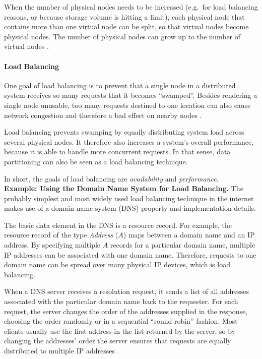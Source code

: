 When the number of physical nodes needs to be increased (e.g.\ for load balancing reasons, or because storage volume is hitting a limit), each physical node that contains more than one virtual node can be split, so that virtual nodes become physical nodes. The number of physical nodes can grow up to the number of virtual nodes \cite[p.~166f]{ASL10} \cite{Bas10b}.

\paragraph{Load Balancing}
One goal of load balancing is to prevent that a single node in a distributed system receives so many requests that it becomes ``swamped''. Besides rendering a single node unusable, too many requests destined to one location can also cause network congestion and therefore a bad effect on nearby nodes \cite{KLL+97}.

Load balancing prevents swamping by equally distributing system load across several physical nodes. It therefore also increases a system's overall performance, because it is able to handle more concurrent requests. In that sense, data partitioning can also be seen as a load balancing technique.

In short, the goals of load balancing are \emph{availability} and \emph{performance}.\\

\noindent
{\bf Example: Using the Domain Name System for Load Balancing.} The probably simplest and most widely used load balancing technique in the internet makes use of a domain name system (DNS) property and implementation details.

The basic data element in the DNS is a resource record. For example, the resource record of the type \emph{Address} ($A$) maps between a domain name and an IP address. By specifying multiple $A$ records for a particular domain name, multiple IP addresses can be associated with one domain name. Therefore, requests to one domain name can be spread over many physical IP devices, which is load balancing.

When a DNS server receives a resolution request, it sends a list of all addresses associated with the particular domain name back to the requester. For each request, the server changes the order of the addresses supplied in the response, choosing the order randomly or in a sequential ``round robin'' fashion. Most clients usually use the first address in the list returned by the server, so by changing the addresses' order the server ensures that requests are equally distributed to multiple IP addresses \cite[p.~904f]{Koz05}.

